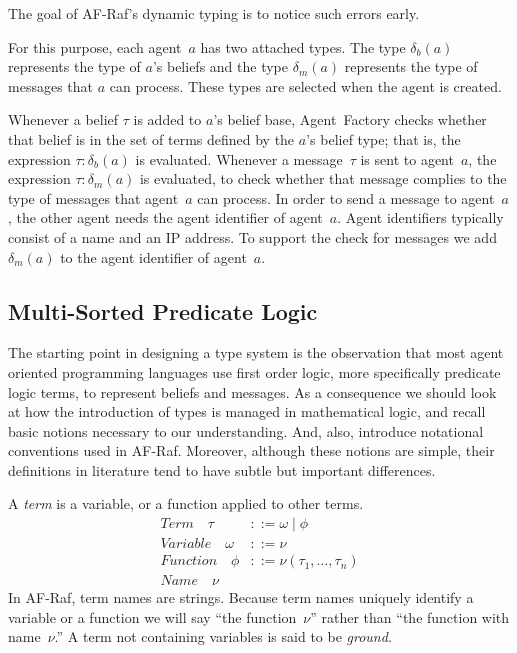 \documentclass[a4paper,12pt,oneside,fleqn]{book} %
\begin{document}
The goal of AF-Raf's dynamic typing is to notice such errors early.

For this purpose, each agent~$a$ has two attached types. The type $\delta_b(a)$
represents the type of $a$'s beliefs and the type $\delta_m(a)$ represents the
type of messages that $a$ can process. These types are selected when the agent
is created.

Whenever a belief $\tau$ is added to $a$'s belief base, Agent~Factory checks
whether that belief is in the set of terms defined by the $a$'s belief type;
that is, the expression $\tau:\delta_b(a)$ is evaluated.  Whenever a
message~$\tau$ is sent to agent~$a$, the expression $\tau:\delta_m(a)$ is
evaluated, to check whether that message complies to the type of messages that
agent~$a$ can process. In order to send a message to agent~$a$, the other agent
needs the agent identifier of agent~$a$. Agent identifiers typically consist of
a name and an IP address. To support the check for messages we add
$\delta_m(a)$ to the agent identifier of agent~$a$.

\subsection{Multi-Sorted Predicate Logic} \label{sec:multi-sorted} %

The starting point in designing a type system is the observation that most
agent oriented programming languages use first order logic, more
specifically predicate logic terms, to represent beliefs and messages. As a
consequence we should look at how the introduction of types is managed in
mathematical logic, and recall basic notions necessary to our
understanding. And, also, introduce notational conventions used in AF-Raf.
Moreover, although these notions are simple, their definitions in
literature tend to have subtle but important differences.

A \emph{term} is a variable, or a function applied to other terms.
\begin{align}
\mathit{Term}\quad\tau &::= \omega \mid \phi \\
\mathit{Variable}\quad\omega &::= \nu \\
\mathit{Function}\quad\phi &::= \nu(\tau_1,\ldots,\tau_n) \\
\mathit{Name}\quad\nu
\end{align}
In AF-Raf, term names are strings.  Because term names uniquely identify a
variable or a function we will say ``the function~$\nu$'' rather than ``the
function with name~$\nu$.'' A term not containing variables is said to be
\emph{ground}.
\end{document}

